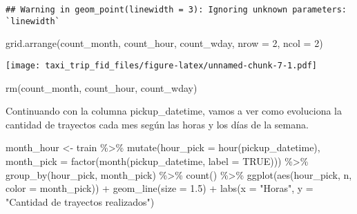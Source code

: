 \documentclass[
]{article}
\newenvironment{Shaded}{\begin{snugshade}}{\end{snugshade}}
\newcommand{\AttributeTok}[1]{\textcolor[rgb]{0.77,0.63,0.00}{#1}}
\newcommand{\ConstantTok}[1]{\textcolor[rgb]{0.00,0.00,0.00}{#1}}
\newcommand{\DecValTok}[1]{\textcolor[rgb]{0.00,0.00,0.81}{#1}}
\newcommand{\FloatTok}[1]{\textcolor[rgb]{0.00,0.00,0.81}{#1}}
\newcommand{\FunctionTok}[1]{\textcolor[rgb]{0.00,0.00,0.00}{#1}}
\newcommand{\NormalTok}[1]{#1}
\newcommand{\OtherTok}[1]{\textcolor[rgb]{0.56,0.35,0.01}{#1}}
\newcommand{\SpecialCharTok}[1]{\textcolor[rgb]{0.00,0.00,0.00}{#1}}
\newcommand{\StringTok}[1]{\textcolor[rgb]{0.31,0.60,0.02}{#1}}
\begin{document}
\begin{verbatim}
## Warning in geom_point(linewidth = 3): Ignoring unknown parameters: `linewidth`
\end{verbatim}

\begin{Shaded}
\begin{Highlighting}[]
\FunctionTok{grid.arrange}\NormalTok{(count\_month, count\_hour, count\_wday, }\AttributeTok{nrow =} \DecValTok{2}\NormalTok{, }\AttributeTok{ncol =} \DecValTok{2}\NormalTok{)}
\end{Highlighting}
\end{Shaded}

\texttt{[image: taxi\_trip\_fid\_files/figure-latex/unnamed-chunk-7-1.pdf]}

\begin{Shaded}
\begin{Highlighting}[]
\FunctionTok{rm}\NormalTok{(count\_month, count\_hour, count\_wday)}
\end{Highlighting}
\end{Shaded}

Continuando con la columna pickup\_datetime, vamos a ver como evoluciona
la cantidad de trayectos cada mes según las horas y los días de la
semana.

\begin{Shaded}
\begin{Highlighting}[]
\NormalTok{month\_hour }\OtherTok{\textless{}{-}}\NormalTok{ train }\SpecialCharTok{\%\textgreater{}\%}
  \FunctionTok{mutate}\NormalTok{(}\AttributeTok{hour\_pick =} \FunctionTok{hour}\NormalTok{(pickup\_datetime),}
         \AttributeTok{month\_pick =} \FunctionTok{factor}\NormalTok{(}\FunctionTok{month}\NormalTok{(pickup\_datetime, }\AttributeTok{label =} \ConstantTok{TRUE}\NormalTok{))) }\SpecialCharTok{\%\textgreater{}\%}
  \FunctionTok{group\_by}\NormalTok{(hour\_pick, month\_pick) }\SpecialCharTok{\%\textgreater{}\%}
  \FunctionTok{count}\NormalTok{() }\SpecialCharTok{\%\textgreater{}\%}
  \FunctionTok{ggplot}\NormalTok{(}\FunctionTok{aes}\NormalTok{(hour\_pick, n, }\AttributeTok{color =}\NormalTok{ month\_pick)) }\SpecialCharTok{+}
  \FunctionTok{geom\_line}\NormalTok{(}\AttributeTok{size =} \FloatTok{1.5}\NormalTok{) }\SpecialCharTok{+}
  \FunctionTok{labs}\NormalTok{(}\AttributeTok{x =} \StringTok{"Horas"}\NormalTok{, }\AttributeTok{y =} \StringTok{"Cantidad de trayectos realizados"}\NormalTok{)}
\end{Highlighting}
\end{Shaded}
\end{document}
